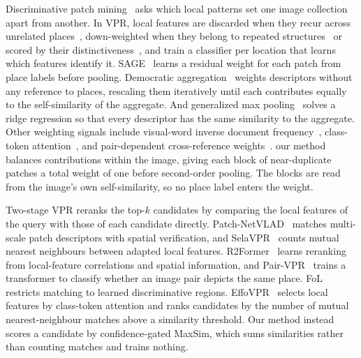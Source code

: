 Discriminative patch mining~\citep{whatmakesparis,modeseeking} asks which local patterns set one image collection apart from another.
In VPR, local features are discarded when they recur across unrelated places~\citep{knopp}, down-weighted when they belong to repeated structures~\citep{repetitive} or scored by their distinctiveness~\citep{dislocation}, and \citet{perlocation} train a classifier per location that learns which features identify it. 
SAGE~\citep{sage} learns a residual weight for each patch from place labels before pooling.
Democratic aggregation~\citep{democratic} weights descriptors without any reference to places, rescaling them iteratively until each contributes equally to the self-similarity of the aggregate. And generalized max pooling~\citep{gmp} solves a ridge regression so that every descriptor has the same similarity to the aggregate.
Other weighting signals include visual-word inverse document frequency~\citep{videogoogle}, class-token attention~\citep{effovpr}, and pair-dependent cross-reference weights~\citep{deepemd}. 
our method balances contributions within the image, giving each block of near-duplicate patches a total weight of one before second-order pooling.
The blocks are read from the image's own self-similarity, so no place label enters the weight.

Two-stage VPR reranks the top-$k$ candidates by comparing the local features of the query with those of each candidate directly. 
Patch-NetVLAD~\citep{patchnetvlad} matches multi-scale patch descriptors with spatial verification, and SelaVPR~\citep{selavpr} counts mutual nearest neighbours between adapted local features. 
R2Former~\citep{r2former} learns reranking from local-feature correlations and spatial information, and Pair-VPR~\citep{pairvpr} trains a transformer to classify whether an image pair depicts the same place. 
FoL~\citep{fol} restricts matching to learned discriminative regions. 
EffoVPR~\citep{effovpr} selects local features by class-token attention and ranks candidates by the number of mutual nearest-neighbour matches above a similarity threshold.
Our method instead scores a candidate by confidence-gated MaxSim, which sums similarities rather than counting matches and trains nothing.


